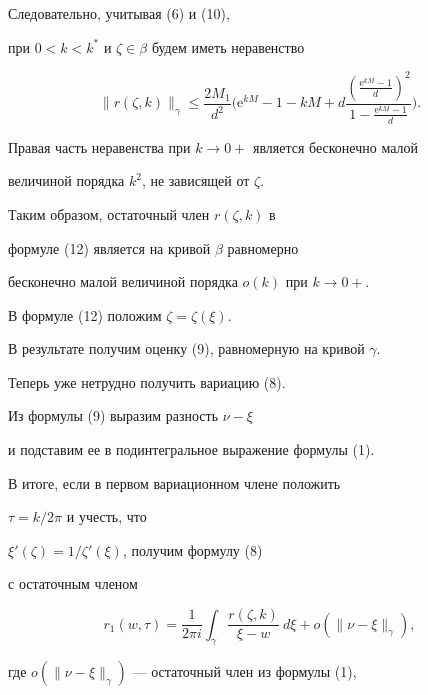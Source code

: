 \begin{pf}
\begin{equation}
\end{equation}


Следовательно, учитывая (6) и (10),


при $0<k<k^{*}$ и $\zeta\in \beta$ будем иметь неравенство


\begin{equation}


\|r(\zeta,k)\|_{\gamma}\le


\frac{2M_{1}}{d^{2}}


\bigg(\mathrm e^{kM}-1-kM+


d\frac{(\frac{\mathrm e^{kM}-1}{d})^{2}}


{1-\frac{\mathrm e^{kM}-1}{d}}\bigg).


\end{equation}


Правая часть неравенства при $k\to 0+$ является бесконечно малой 


величиной порядка $k^{2}$, не зависящей от $\zeta$.


Таким образом, остаточный член $r(\zeta,k)$ в


формуле (12) является на кривой $\beta$ равномерно 


бесконечно малой величиной порядка $o(k)$ при $k\to 0+$.


В формуле (12) положим $\zeta=\zeta(\xi)$.


В результате получим оценку (9), равномерную на кривой $\gamma$.





Теперь уже нетрудно получить вариацию (8). 


Из формулы (9) выразим разность $\nu-\xi$


и подставим ее в подинтегральное выражение формулы (1).


В итоге, если в первом вариационном члене положить 


$\tau=k/2\pi$ и учесть, что


$\xi'(\zeta)=1/\zeta'(\xi)$, получим формулу (8)


с остаточным членом


\begin{equation}


r_{1}(w,\tau)=\frac{1}{2\pi i}\int_{\gamma}


\frac{r(\zeta,k)}{\xi-w}~d\xi + o(\|\nu-\xi\|_{\gamma}),


\end{equation}


где $o(\|\nu-\xi\|_{\gamma})$ --- остаточный член из формулы (1),



\end{pf}
